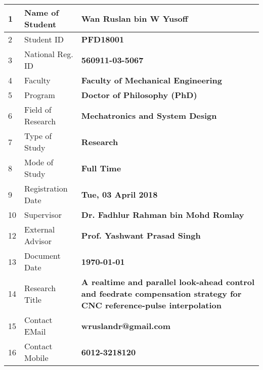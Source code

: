 \begin{titlepage}
\begin{table}[ht]
\begin{center}
\begin{tabular}{ |p{0.5cm}|p{5.4cm}|p{10.0cm}| }
			\hline 1 & Name of Student    & \textbf{Wan Ruslan bin W Yusoff} \\ 
			\hline 2 & Student ID         & \textbf{PFD18001} \\ 
			\hline 3 & National Reg. ID   & \textbf{560911-03-5067} \\ 
			\hline 4 & Faculty            & \textbf{Faculty of Mechanical Engineering} \\ 
			\hline 5 & Program            & \textbf{Doctor of Philosophy (PhD)} \\ 
			\hline 6 & Field of Research  & \textbf{Mechatronics and System Design} \\ 
			\hline 7 & Type of Study      & \textbf{Research}\\ 
			\hline 8 & Mode of Study      & \textbf{Full Time} \\ 
			\hline 9 & Registration Date  & \textbf{Tue, 03 April 2018} \\ 
			\hline 10 & Supervisor         & \textbf{Dr. Fadhlur Rahman bin Mohd Romlay} \\ 
			\hline 12 & External Advisor  & \textbf{Prof. Yashwant Prasad Singh} \\ 
			\hline 13 & Document Date     & \textbf{\today} \\ 
			\hline 14 & Research Title    & \textbf{A realtime and parallel look-ahead control and feedrate compensation strategy for CNC reference-pulse
				 interpolation} \\ 
			\hline 15 & Contact EMail     & \textbf{wruslandr@gmail.com} \\
			\hline 16 & Contact Mobile    & \textbf{6012-3218120} \\
			\hline
		\end{tabular}
		\label{table:PhD Program Registration Details}
	\end{center}
\end{table}  



\end{titlepage}

